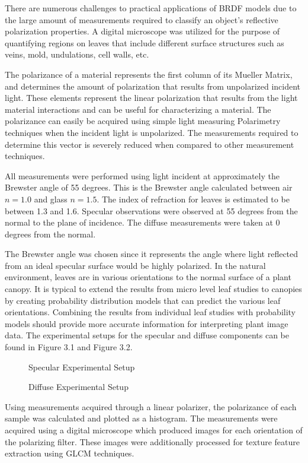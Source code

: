 There are numerous challenges to practical applications of BRDF models due to the large amount of measurements required to classify an object's reflective polarization properties.  A digital microscope was utilized for the purpose of quantifying regions on leaves that include different surface structures such as veins, mold, undulations, cell walls, etc.

The polarizance of a material represents the first column of its Mueller Matrix, and determines the amount of polarization that results from unpolarized incident light.  These elements represent the linear polarization that results from the light material interactions and can be useful for characterizing a material.  The polarizance can easily be acquired using simple light measuring Polarimetry techniques when the incident light is unpolarized.  The measurements required to determine this vector is severely reduced when compared to other measurement techniques.

All measurements were performed using light incident at approximately the Brewster angle of 55 degrees. This is the Brewster angle calculated between air $n=1.0$ and glass $n=1.5$.  The index of refraction for leaves is estimated to be between 1.3 and 1.6. Specular observations were observed at 55 degrees from the normal to the plane of incidence.  The diffuse measurements were taken at 0 degrees from the normal.

The Brewster angle was chosen since it represents the angle where light reflected from an ideal specular surface would be highly polarized.  In the natural environment, leaves are in various orientations to the normal surface of a plant canopy.  It is typical to extend the results from micro level leaf studies to canopies by creating probability distribution models that can predict the various leaf orientations.  Combining the results from individual leaf studies with probability models should provide more accurate information for interpreting plant image data. The experimental setups for the specular and diffuse components can be found in  Figure 3.1 and Figure 3.2.
%
\begin{figure}[!htb]
    \begin{center}
    \end{center}
    \caption{Specular Experimental Setup}
    \label{fig:Experiment}
\end{figure}
\begin{figure}[!htb]
    \begin{center}
    \end{center}
    \caption{Diffuse Experimental Setup}
    \label{fig:Experiment}
\end{figure}
%
Using measurements acquired through a linear polarizer, the polarizance of each sample was calculated and plotted as a histogram.  The measurements were acquired using a digital microscope which produced images for each orientation of the polarizing filter.  These images were additionally processed for texture feature extraction using GLCM techniques.

